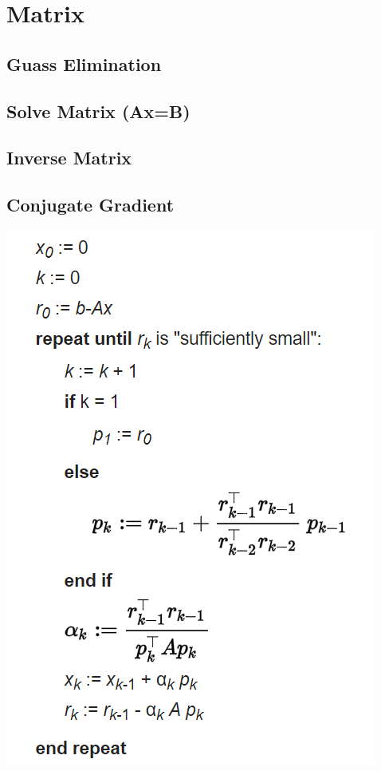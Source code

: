 \documentclass[10pt,twocolumn,oneside]{article}
\begin{document}
    \section{Matrix}
    \subsection{Guass Elimination}
    \subsection{Solve Matrix (Ax=B)}
    \subsection{Inverse Matrix}
    
    \subsection{Conjugate Gradient}
    \includegraphics{./../codebook/math/matrix/cg.png}
\end{document}
